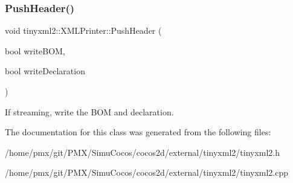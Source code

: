 \subsubsection{\texorpdfstring{Push\+Header()}{PushHeader()}\hspace{0.1cm}{\footnotesize\ttfamily [2/2]}}
{\footnotesize\ttfamily void tinyxml2\+::\+X\+M\+L\+Printer\+::\+Push\+Header (\begin{DoxyParamCaption}\item[{bool}]{write\+B\+OM,  }\item[{bool}]{write\+Declaration }\end{DoxyParamCaption})}

If streaming, write the B\+OM and declaration. 

The documentation for this class was generated from the following files\+:\begin{DoxyCompactItemize}
\item 
/home/pmx/git/\+P\+M\+X/\+Simu\+Cocos/cocos2d/external/tinyxml2/tinyxml2.\+h\item 
/home/pmx/git/\+P\+M\+X/\+Simu\+Cocos/cocos2d/external/tinyxml2/tinyxml2.\+cpp\end{DoxyCompactItemize}
